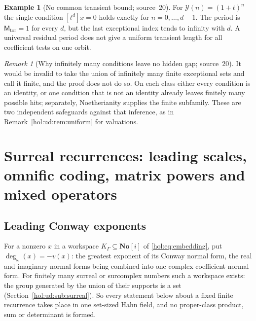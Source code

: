 \documentclass[11pt]{article}
\numberwithin{equation}{section}
\theoremstyle{definition}
\newtheorem{example}[theorem]{Example}
\theoremstyle{remark}
\newtheorem{remark}[theorem]{Remark}
\newcommand{\No}{\mathbf{No}}
\begin{document}
\begin{example}[No common transient bound; source~20]
\label{hol:rc:ex:transient}
For $\mathcal Y(n)=(1+t)^n$ the single condition $[t^d]x=0$ holds exactly for
$n=0,\ldots,d-1$. The period is $\mathsf M_{\mathrm{tor}}=1$ for every $d$, but
the last exceptional index tends to infinity with $d$. A universal residual
period does not give a uniform transient length for all coefficient tests on
one orbit.
\end{example}

\begin{remark}[Why infinitely many conditions leave no hidden gap;
source~20]\label{hol:rc:rem:safeguards}
It would be invalid to take the union of infinitely many finite exceptional
sets and call it finite, and the proof does not do so. On each class either
every condition is an identity, or one condition that is not an identity
already leaves finitely many possible hits; separately, Noetherianity supplies
the finite subfamily. These are two independent safeguards against that
inference, as in Remark~\ref{hol:ud:rem:uniform} for valuations.
\end{remark}

\section{Surreal recurrences: leading scales, omnific coding, matrix powers
and mixed operators}\label{hol:rc:sec:surreal}

\subsection{Leading Conway exponents}\label{hol:rc:sub:leading}

For a nonzero $x$ in a workspace $K_\Gamma\subseteq\No[i]$ of
\eqref{hol:eq:embedding}, put $\deg_\omega(x)=-v(x)$: the greatest exponent of
its Conway normal form, the real and imaginary normal forms being combined
into one complex-coefficient normal form. For finitely many surreal or
surcomplex numbers such a workspace exists: the group generated by the union
of their supports is a set (Section~\ref{hol:ud:sub:surreal}). So every
statement below about a fixed finite recurrence takes place in one set-sized
Hahn field, and no proper-class product, sum or determinant is formed.
\end{document}
